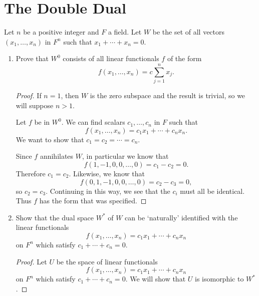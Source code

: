 \section{The Double Dual}

 Let $n$ be a positive integer and $F$ a field. Let $W$ be
the set of all vectors $(x_1,\dots,x_n)$ in $F^n$ such that
$x_1+\cdots+x_n=0$.
\begin{enumerate}
\item
  \label{itm:lin-tran:W0-f-eql-coef}
  Prove that $W^0$ consists of all linear functionals $f$ of the
  form
  \begin{equation*}
    f(x_1,\dots,x_n) = c\sum_{j=1}^nx_j.
  \end{equation*}
  \begin{proof}
    If $n = 1$, then $W$ is the zero subspace and the result is
    trivial, so we will suppose $n > 1$.

    Let $f$ be in $W^0$. We can find scalars $c_1,\dots,c_n$ in $F$
    such that
    \begin{equation*}
      f(x_1,\dots,x_n) = c_1x_1 + \cdots + c_nx_n.
    \end{equation*}
    We want to show that $c_1 = c_2 = \cdots = c_n$.

    Since $f$ annihilates $W$, in particular we know that
    \begin{equation*}
      f(1, -1, 0, 0, \dots, 0) = c_1 - c_2 = 0.
    \end{equation*}
    Therefore $c_1 = c_2$. Likewise, we know that
    \begin{equation*}
      f(0, 1, -1, 0, 0, \dots, 0) = c_2 - c_3 = 0,
    \end{equation*}
    so $c_2 = c_3$. Continuing in this way, we see that the $c_i$ must
    all be identical. Thus $f$ has the form that was specified.
  \end{proof}

\item Show that the dual space $W^*$ of $W$ can be `naturally'
  identified with the linear functionals
  \begin{equation*}
    f(x_1,\dots,x_n) = c_1x_1 + \cdots + c_nx_n
  \end{equation*}
  on $F^n$ which satisfy $c_1 + \cdots + c_n = 0$.
  \begin{proof}
    Let $U$ be the space of linear functionals
    \begin{equation*}
      f(x_1,\dots,x_n) = c_1x_1 + \cdots + c_nx_n
    \end{equation*}
    on $F^n$ which satisfy $c_1 + \cdots + c_n = 0$. We will show that
    $U$ is isomorphic to $W^*$.


\end{proof}
\end{enumerate}
